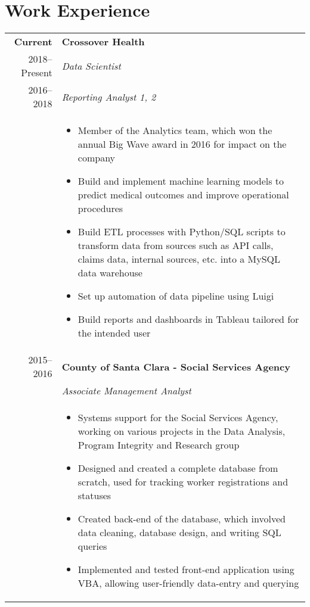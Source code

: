 \documentclass[letterpaper,10pt]{article}
\begin{document}
\nopagebreak
\section{Work Experience}
\begin{tabular}{rp{13cm}}
  \textbf{Current} & \textbf{Crossover Health} \\
 	2018--Present & \emph{Data Scientist} \\
	2016--2018	&	\emph{Reporting Analyst 1, 2} \\
		& 
			\begin{itemize}
            \item Member of the Analytics team, which won the annual Big Wave award in 2016 for impact on the company
			\item Build and implement machine learning models to predict medical outcomes and improve operational procedures %
			\item Build ETL processes with Python/SQL scripts to transform data from sources such as API calls, claims data, internal sources, etc. into a MySQL data warehouse  
			\item Set up automation of data pipeline using Luigi
			\item Build reports and dashboards in Tableau tailored for the intended user
			\end{itemize}\\
	2015--2016 & \textbf{County of Santa Clara - Social Services Agency} \\
 		& \emph{Associate Management Analyst}\\
		& 
			\begin{itemize}
			\item Systems support for the Social Services Agency, working on various projects in the Data Analysis, Program Integrity and Research group
			\item Designed and created a complete database from scratch, used for tracking worker registrations and statuses
			\item Created back-end of the database, which involved data cleaning, database design, and writing SQL queries
			\item Implemented and tested front-end application using VBA, allowing user-friendly data-entry and querying
			\end{itemize} \\

\end{tabular}
\end{document}
